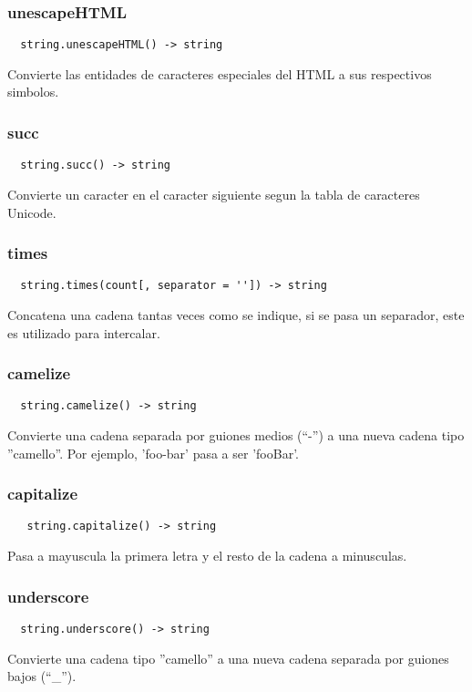 \subsubsection*{unescapeHTML}
\begin{verbatim}
  string.unescapeHTML() -> string
\end{verbatim}
Convierte las entidades de caracteres especiales del HTML a sus respectivos
simbolos.

\subsubsection*{succ}
\begin{verbatim}
  string.succ() -> string
\end{verbatim}
Convierte un caracter en el caracter siguiente segun la tabla de caracteres
Unicode.

\subsubsection*{times}
\begin{verbatim}
  string.times(count[, separator = '']) -> string
\end{verbatim}
Concatena una cadena tantas veces como se indique, si se pasa un separador, este
es utilizado para intercalar.

\subsubsection*{camelize}
\begin{verbatim}
  string.camelize() -> string
\end{verbatim}
Convierte una cadena separada por guiones medios (``-'') a una nueva cadena tipo
''camello''. Por ejemplo, 'foo-bar' pasa a ser 'fooBar'.

\subsubsection*{capitalize}
\begin{verbatim}
   string.capitalize() -> string
\end{verbatim}
Pasa a mayuscula la primera letra y el resto de la cadena a minusculas.

\subsubsection*{underscore}
\begin{verbatim}
  string.underscore() -> string
\end{verbatim}
Convierte una cadena tipo ''camello'' a una nueva cadena separada por guiones
bajos (``\_'').

